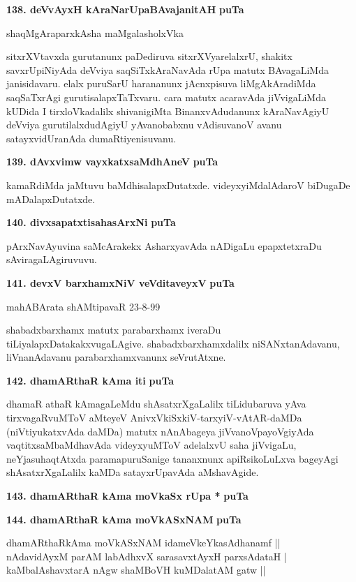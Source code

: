\medskip
\noindent
\textbf{138. deVvAyxH kAraNarUpaBAvajanitAH} \hfill{\bf puTa }

\hfill{shaqMgAraparxkAsha maMgalasholxVka}

\smallskip
sitxrXVtavxda gurutanunx paDediruva sitxrXVyarelalxrU, shakitx savxrUpiNiyAda deVviya saqSiTxkAraNavAda rUpa matutx BAvagaLiMda janisidavaru. elalx puruSarU harananunx jAcnxpisuva liMgAkAradiMda saqSaTxrAgi gurutisalapxTaTxvaru. cara matutx acaravAda jiVvigaLiMda kUDida I tirxloVkadalilx shivanigiMta BinanxvAdudanunx kAraNavAgiyU deVviya gurutilalxdudAgiyU yAvanobabxnu vAdisuvanoV avanu satayxvidUranAda dumaRtiyenisuvanu.

\medskip
\noindent
\textbf{139. dAvxvimw vayxkatxsaMdhAneV} \hfill{\bf puTa }

\smallskip
kamaRdiMda jaMtuvu baMdhisalapxDutatxde. videyxyiMdalAdaroV biDugaDe mADalapxDutatxde.

\medskip
\noindent
\textbf{140. divxsapatxtisahasArxNi} \hfill{\bf puTa }

\smallskip
pArxNavAyuvina saMcArakekx AsharxyavAda nADigaLu epapxtetxraDu sAviragaLAgiruvuvu.

\eject

\noindent
\textbf{141. devxV barxhamxNiV veVditaveyxV} \hfill{\bf puTa }

\hfill{mahABArata shAMtipavaR 23-8-99}

\smallskip
shabadxbarxhamx matutx parabarxhamx iveraDu tiLiyalapxDatakakxvugaLAgive. shabadxbarxhamxdalilx niSANxtanAdavanu, liVnanAdavanu parabarxhamxvanunx seVrutAtxne.


\medskip
\noindent
\textbf{142. dhamARthaR kAma iti} \hfill{\bf puTa }

\smallskip
dhamaR athaR kAmagaLeMdu shAsatxrXgaLalilx tiLidubaruva yAva tirxvagaRvuMToV aMteyeV AnivxVkiSxkiV-tarxyiV-vAtAR-daMDa (niVtiyukatxvAda daMDa) matutx nAnAbageya jiVvanoVpayoVgiyAda vaqtitxsaMbaMdhavAda videyxyuMToV adelalxvU saha jiVvigaLu, neYjasuhaqtAtxda paramapuruSanige tananxnunx apiRsikoLuLxva bageyAgi shAsatxrXgaLalilx kaMDa satayxrUpavAda aMshavAgide.

\medskip
\noindent
\textbf{143. dhamARthaR kAma moVkaSx rUpa *} \hfill{\bf puTa }

\medskip
\noindent
\textbf{144. dhamARthaR kAma moVkASxNAM} \hfill{\bf puTa }

\begin{shloka}
dhamARthaRkAma moVkASxNAM idameVkeYkasAdhanamf ||\\
nAdavidAyxM parAM labAdhxvX sarasavxtAyxH parxsAdataH |\\
kaMbalAshavxtarA nAgw shaMBoVH kuMDalatAM gatw ||
\end{shloka}

